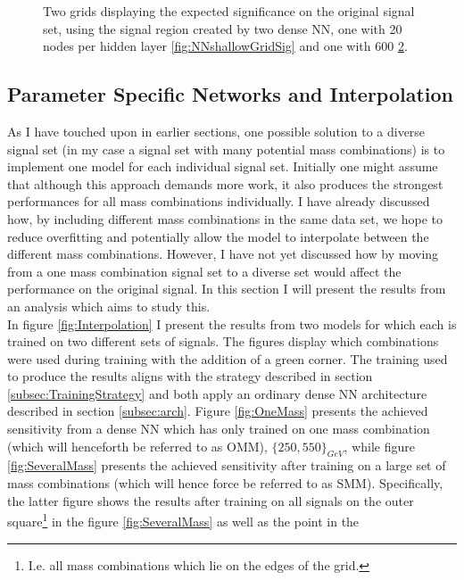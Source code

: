 \begin{figure}
{\begin{subfigure}{.6\textwidth}
        \vspace{-1.cm}
        \caption{}
        \label{fig:NNGridSig}
    \end{subfigure}
    }
    \caption{Two grids displaying the expected significance on the original signal set, using the signal region 
    created by two dense \acs{NN}, one with 20 nodes per hidden layer \ref{fig:NNshallowGridSig} and one with 600 \ref{fig:NNGridSig}.}
\end{figure}
\subsection{Parameter Specific Networks and Interpolation}
As I have touched upon in earlier sections, one possible solution to a diverse signal set (in my case a signal set with many 
potential mass combinations) is to implement one model for each individual signal set. Initially one might assume that although 
this approach demands more work, it also produces the strongest performances for all mass combinations individually. I have already 
discussed how, by including different mass combinations in the same data set, we hope to reduce overfitting and potentially allow 
the model to interpolate between the different mass combinations. However, I have not yet discussed how by moving from a one 
mass combination signal set to a diverse set would affect the performance on the original signal. In this section I will present the 
results from an analysis which aims to study this.
\\
In figure \ref{fig:Interpolation} I present the results from two models for which each is trained on two different sets of signals.
The figures display which combinations were used during training with the addition of a green corner. 
The training used to produce the results aligns with the strategy described in section \ref{subsec:TrainingStrategy} and both apply
an ordinary dense \ac{NN} architecture described in section \ref{subsec:arch}. Figure \ref{fig:OneMass} presents the achieved sensitivity 
from a dense \ac{NN} which has only trained on one mass combination (which will henceforth be referred to as \ac{OMM}), $\{250,550\}_{GeV}$, 
while figure \ref{fig:SeveralMass} presents the achieved sensitivity after training on a large set of mass combinations 
(which will hence force be referred to as \ac{SMM}). Specifically, the latter figure shows the results after training on all signals on the outer 
square\footnote{I.e. all mass combinations which lie on the edges of the grid.} in the figure \ref{fig:SeveralMass} as well as the point in the 
